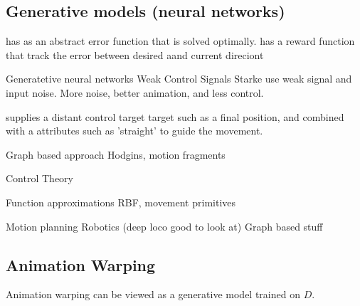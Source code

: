 \subsection{Generative models (neural networks)}
\citep{kovar02} has as an abstract error function that is solved optimally.
\citep{lee10} has a reward function that track the error between desired aand current direciont

Generatetive neural networks Weak Control Signals
    Starke use weak signal and input noise. More noise, better animation, and less control.

    \citep{lee18} supplies a distant control target target such as a final position, and combined with a attributes such as 'straight' to guide the movement.

Graph based approach 
    Hodgins, motion fragments

Control Theory

Function approximations 
    RBF, movement primitives

Motion planning
    Robotics (deep loco good to look at)
    Graph based stuff



\subsection{Animation Warping}
Animation warping can be viewed as a generative model trained on $D$. 

